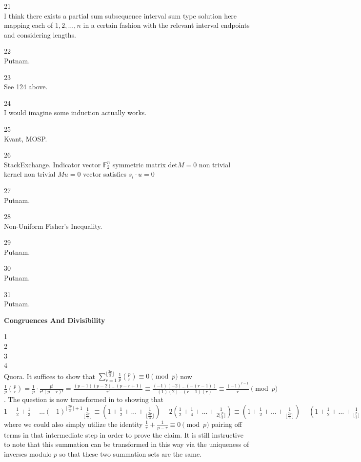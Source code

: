 21 \\
I think there exists a partial sum subsequence interval sum type solution here mapping each of $1,2,\dots,n$ in a certain fashion with the relevant interval endpoints and considering lengths.

22 \\
Putnam.

23 \\
See 124 above.

24 \\
I would imagine some induction actually works.

25 \\
Kvant, MOSP.

26 \\
StackExchange. Indicator vector $\mathbb{F}_2^n$ symmetric matrix $\text{det} M=0$ non trivial kernel non trivial $Mu=0$ vector satisfies $s_i \cdot u=0$

27 \\
Putnam.

28 \\
Non-Uniform Fisher's Inequality.

29 \\
Putnam.

30 \\
Putnam.

31 \\
Putnam.

\newpage

\textbf{Congruences And Divisibility}

1 \\


2 \\


3 \\


4 \\
Quora. It suffices to show that $\sum_{r=1}^{\lfloor \frac{2p}{3} \rfloor} \frac{1}{p} \binom{p}{r} \equiv 0 \pmod{p}$ now $\frac{1}{p} \binom{p}{r} = \frac{1}{p} \cdot \frac{p!}{r!(p-r)!}=\frac{(p-1)(p-2)\dots(p-r+1)}{r!} \equiv \frac{(-1)(-2)\dots(-(r-1))}{(1)(2)\dots(r-1)(r)} \equiv \frac{(-1)^{r-1}}{r} \pmod{p}$. The question is now transformed in to showing that $1-\frac{1}{2}+\frac{1}{3}-\dots (-1)^{\lfloor \frac{2p}{3} \rfloor +1} \frac{1}{\lfloor \frac{2p}{3} \rfloor} \equiv \left(1+\frac{1}{2}+\dots+\frac{1}{\lfloor \frac{2p}{3} \rfloor} \right) -2\left(\frac{1}{2}+\frac{1}{4}+\dots+\frac{1}{2 \lfloor \frac{p}{3} \rfloor} \right) \equiv \left(1+\frac{1}{2}+\dots+\frac{1}{\lfloor \frac{2p}{3} \rfloor} \right) -\left(1+\frac{1}{2}+\dots+\frac{1}{\lfloor \frac{p}{3} \rfloor} \right) \equiv \frac{1}{\lceil \frac{p}{3} \rceil}+\frac{1}{\lceil \frac{p}{3} \rceil +1}+\dots+\frac{1}{\lfloor \frac{2p}{3} \rfloor} \equiv 1+\frac{1}{2}+\dots+\frac{1}{p-1} \equiv 1+2+\dots+(p-1) \equiv \frac{p(p-1)}{2} \equiv 0 \pmod{p}$ where we could also simply utilize the identity $\frac{1}{r}+\frac{1}{p-r} \equiv 0 \pmod{p}$ pairing off terms in that intermediate step in order to prove the claim. It is still instructive to note that this summation can be transformed in this way via the uniqueness of inverses modulo $p$ so that these two summation sets are the same.


